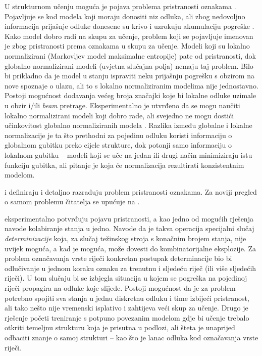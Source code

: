 U strukturnom učenju moguća je pojava problema pristranosti oznakama . Pojavljuje se kod modela koji moraju donositi niz odluka, ali zbog
nedovoljno informacija prijašnje odluke donesene su krivo i uzrokuju akumulaciju
pogreške . Kako model dobro radi na skupu za učenje,
problem koji se pojavljuje imenovan je zbog pristranosti prema oznakama u skupu
za učenje. Modeli koji su lokalno normalizirani (Markovljev model maksimalne
entropije) pate od pristranosti, dok globalno normalizirani modeli (uvjetna
slučajna polja) nemaju taj problem. Bilo bi prikladno da je model u stanju
ispraviti neku prijašnju pogrešku s obzirom na nove spoznaje o ulazu, ali to s
lokalno normaliziranim modelima nije jednostavno. Postoji mogućnost dodavanja
većeg broja značajki koje bi lokalne odluke uzimale u obzir i/ili \textit{beam}
pretrage. Eksperimentalno je utvrđeno da se mogu naučiti lokalno normalizirani
modeli koji dobro rade, ali svejedno ne mogu dostići učinkovitost globalno
normaliziranih modela \citep{liang2008structure}. Razlika između globalne i
lokalne normalizacije je ta što prethodni za pojedinu odluku koristi informaciju
o globalnom gubitku preko cijele strukture, dok potonji samo informaciju o
lokalnom gubitku -- modeli koji se uče na jedan ili drugi način minimiziraju
istu funkciju gubitka, ali pitanje je koja će normalizacija rezultirati
konzistentnim modelom.

\citet*{lafferty2001conditional} i \citet*{leon1991approche} definiraju i
detaljno razrađuju problem pristranosti oznakama. Za noviji pregled o samom
problemu čitatelja se upućuje na \citep{andor2016globally}.

\citet*{lafferty2001conditional} eksperimentalno potvrđuju pojavu pristranosti,
a kao jedno od mogućih rješenja navode kolabiranje stanja u jedno. Navode da je
takva operacija specijalni slučaj \emph{determinizacije} koja, za slučaj
težinskog stroja s konačnim brojem stanja, nije uvijek moguća, a kad je moguća,
može dovesti do kombinatorijalne eksplozije. Za problem označavanja vrste riječi
konkretan postupak determinacije bio bi odlučivanje u jednom koraku oznaku za
trenutnu i sljedeću riječ (ili više sljedećih riječi). U tom slučaju bi se
izbjegla situacija u kojem se pogreška na pojedinoj riječi propagira na odluke
koje slijede. Postoji mogućnost da je za problem potrebno spojiti sva stanja u
jednu diskretnu odluku i time izbijeći pristranost, ali tako nešto nije
vremenski isplativo i zahtijeva veći skup za učenje. Drugo je rješenje početi
treniranje s potpuno povezanim modelom gdje bi učenje trebalo otkriti temeljnu
strukturu koja je prisutna u podlozi, ali šteta je unaprijed odbaciti znanje o
samoj strukturi -- kao što je lanac odluka kod označavanja vrste riječi.

